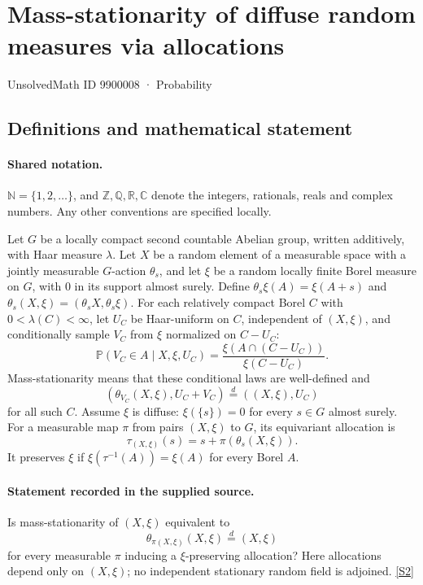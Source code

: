 \documentclass[11pt]{article}
\newcommand{\sref}[2]{\hyperlink{source:#1:#2}{[S#2]}}
\begin{document}
\setcounter{section}{9900007}
\section{Mass-stationarity of diffuse random measures via allocations}\label{9900008}
{\small\sffamily UnsolvedMath ID 9900008 · Probability}
\subsection{Definitions and mathematical statement}

\paragraph{Shared notation.}$\mathbb N=\{1,2,\ldots\}$, and $\mathbb Z,\mathbb Q,\mathbb R,\mathbb C$ denote the integers, rationals, reals and complex numbers. Any other conventions are specified locally.


Let $G$ be a locally compact second countable Abelian group, written additively, with Haar measure $\lambda$. Let $X$ be a random element of a measurable space with a jointly measurable $G$-action $\theta_s$, and let $\xi$ be a random locally finite Borel measure on $G$, with $0$ in its support almost surely. Define $\theta_s\xi(A)=\xi(A+s)$ and $\theta_s(X,\xi)=(\theta_sX,\theta_s\xi)$. For each relatively compact Borel $C$ with $0<\lambda(C)<\infty$, let $U_C$ be Haar-uniform on $C$, independent of $(X,\xi)$, and conditionally sample $V_C$ from $\xi$ normalized on $C-U_C$:
\[\mathbb P(V_C\in A\mid X,\xi,U_C)=\frac{\xi(A\cap(C-U_C))}{\xi(C-U_C)}.\]
Mass-stationarity means that these conditional laws are well-defined and
\[(\theta_{V_C}(X,\xi),U_C+V_C)\stackrel d=((X,\xi),U_C)\]
for all such $C$. Assume $\xi$ is diffuse: $\xi(\{s\})=0$ for every $s\in G$ almost surely. For a measurable map $\pi$ from pairs $(X,\xi)$ to $G$, its equivariant allocation is
\[\tau_{(X,\xi)}(s)=s+\pi(\theta_s(X,\xi)).\]
It preserves $\xi$ if $\xi(\tau^{-1}(A))=\xi(A)$ for every Borel $A$.
\paragraph{Statement recorded in the supplied source.}
Is mass-stationarity of $(X,\xi)$ equivalent to
\[\theta_{\pi(X,\xi)}(X,\xi)\stackrel d=(X,\xi)\]
for every measurable $\pi$ inducing a $\xi$-preserving allocation? Here allocations depend only on $(X,\xi)$; no independent stationary random field is adjoined. \sref{9900008}{2}
\end{document}
